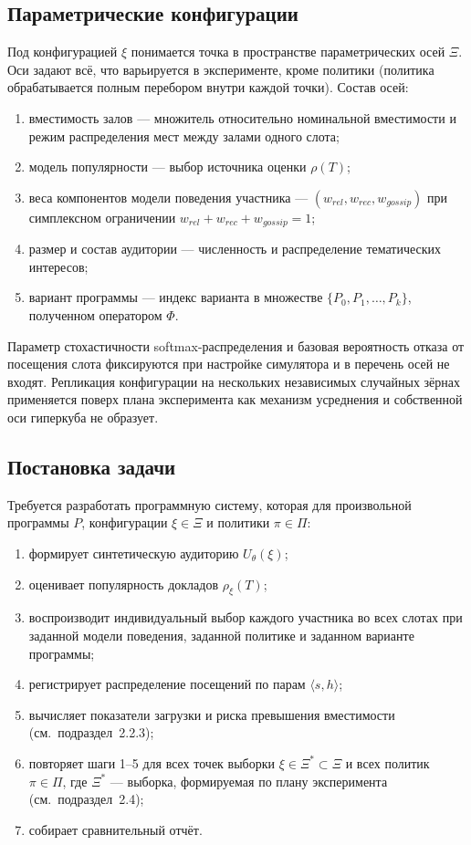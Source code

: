 \subsection{Параметрические конфигурации}

Под конфигурацией $\xi$ понимается точка в пространстве параметрических осей $\Xi$. Оси задают всё, что варьируется в эксперименте, кроме политики (политика обрабатывается полным перебором внутри каждой точки). Состав осей:

\begin{enumerate}
\item вместимость залов --- множитель относительно номинальной вместимости и режим распределения мест между залами одного слота;
\item модель популярности --- выбор источника оценки $\rho(T)$;
\item веса компонентов модели поведения участника --- $(w_{rel}, w_{rec}, w_{gossip})$ при симплексном ограничении $w_{rel} + w_{rec} + w_{gossip} = 1$;
\item размер и состав аудитории --- численность и распределение тематических интересов;
\item вариант программы --- индекс варианта в множестве $\{P_0, P_1, \dots, P_k\}$, полученном оператором $\Phi$.
\end{enumerate}

Параметр стохастичности softmax-распределения и базовая вероятность отказа от посещения слота фиксируются при настройке симулятора и в перечень осей не входят. Репликация конфигурации на нескольких независимых случайных зёрнах применяется поверх плана эксперимента как механизм усреднения и собственной оси гиперкуба не образует.


\subsection{Постановка задачи}

Требуется разработать программную систему, которая для произвольной программы $P$, конфигурации $\xi \in \Xi$ и политики $\pi \in \Pi$:

\begin{enumerate}
\item формирует синтетическую аудиторию $U_\theta(\xi)$;
\item оценивает популярность докладов $\rho_\xi(T)$;
\item воспроизводит индивидуальный выбор каждого участника во всех слотах при заданной модели поведения, заданной политике и заданном варианте программы;
\item регистрирует распределение посещений по парам $\langle s, h \rangle$;
\item вычисляет показатели загрузки и риска превышения вместимости (см.~подраздел~2.2.3);
\item повторяет шаги 1--5 для всех точек выборки $\xi \in \Xi^* \subset \Xi$ и всех политик $\pi \in \Pi$, где $\Xi^*$ --- выборка, формируемая по плану эксперимента (см.~подраздел~2.4);
\item собирает сравнительный отчёт.
\end{enumerate}

